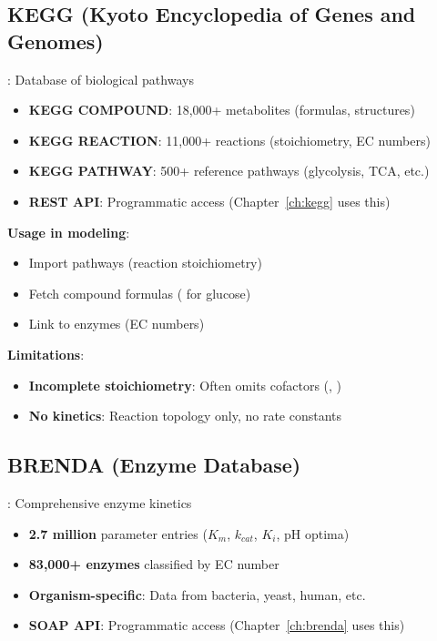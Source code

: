 \subsection{KEGG (Kyoto Encyclopedia of Genes and Genomes)}
\label{subsec:kegg}

\textbf{\citet{Kanehisa2000}}: Database of biological pathways

\begin{itemize}
    \item \textbf{KEGG COMPOUND}: 18,000+ metabolites (formulas, structures)
    \item \textbf{KEGG REACTION}: 11,000+ reactions (stoichiometry, EC numbers)
    \item \textbf{KEGG PATHWAY}: 500+ reference pathways (glycolysis, TCA, etc.)
    \item \textbf{REST API}: Programmatic access (Chapter~\ref{ch:kegg} uses this)
\end{itemize}

\textbf{Usage in modeling}:

\begin{itemize}
    \item Import pathways (reaction stoichiometry)
    \item Fetch compound formulas ( for glucose)
    \item Link to enzymes (EC numbers)
\end{itemize}

\textbf{Limitations}:

\begin{itemize}
    \item \textbf{Incomplete stoichiometry}: Often omits cofactors (, )
    \item \textbf{No kinetics}: Reaction topology only, no rate constants
\end{itemize}

\subsection{BRENDA (Enzyme Database)}
\label{subsec:brenda}

\textbf{\citet{Schomburg2004}}: Comprehensive enzyme kinetics

\begin{itemize}
    \item \textbf{2.7 million} parameter entries ($K_m$, $k_{cat}$, $K_i$, pH optima)
    \item \textbf{83,000+ enzymes} classified by EC number
    \item \textbf{Organism-specific}: Data from bacteria, yeast, human, etc.
    \item \textbf{SOAP API}: Programmatic access (Chapter~\ref{ch:brenda} uses this)
\end{itemize}

